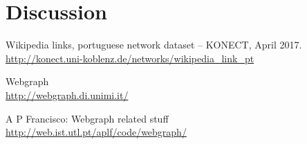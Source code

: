 \documentclass[9pt,a4paper]{article}
\begin{document}
\section{Discussion}

\begin{thebibliography}{9}
Wikipedia links, portuguese network dataset -- KONECT, April 2017.
\\ \url{http://konect.uni-koblenz.de/networks/wikipedia\_link\_pt}

Webgraph
\\ \url{http://webgraph.di.unimi.it/}

A P Francisco: Webgraph related stuff
\\ \url{http://web.ist.utl.pt/aplf/code/webgraph/}

\end{thebibliography}
\end{document}
